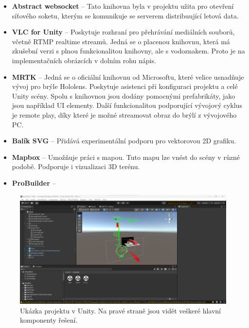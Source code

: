 \begin{itemize}
    \item \textbf{Abstract websocket} -- Tato knihovna byla v projektu užita pro otevření síťového soketu, kterým se komunikuje se serverem distribuující letová data.
    \item \textbf{VLC for Unity} -- Poskytuje rozhraní pro přehrávání mediálních souborů, včetně RTMP realtime streamů. Jedná se o placenou knihovnu, která má zkušební verzi s plnou funkcionalitou knihovny, ale s vodoznakem. Proto je na implementačních obrázcích v dolním rohu nápis.
    \item \textbf{MRTK} -- Jedná se o oficiální knihovnu od Microsoftu, které velice usnadňuje vývoj pro brýle Hololens. Poskytuje asistenci při konfiguraci projektu a celé Unity scény. Spolu s knihovnou jsou dodány pomocnými prefabrikáty, jako jsou například UI elementy. Další funkcionalitou podporující vývojový cyklus je remote play, díky které je možné streamovat obraz do brýlí z vývojového PC.
    \item \textbf{Balík SVG} -- Přidává experimentální podporu pro vektorovou 2D  grafiku.
    \item \textbf{Mapbox} -- Umožňuje práci s mapou. Tuto mapu lze vnést do scény v různé podobě. Podporuje i vizualizaci 3D terénu.
    \item \textbf{ProBuilder} -- 
\end{itemize}
\begin{figure}[H]
    \centering
    \includegraphics[width=1\linewidth]{obrazky-figures//implemetace/unity.png}
    \caption{Ukázka projektu v Unity. Na pravé straně jsou vidět veškeré hlavní komponenty řešení.}
    \label{pic:unity}
\end{figure}
\newpage
